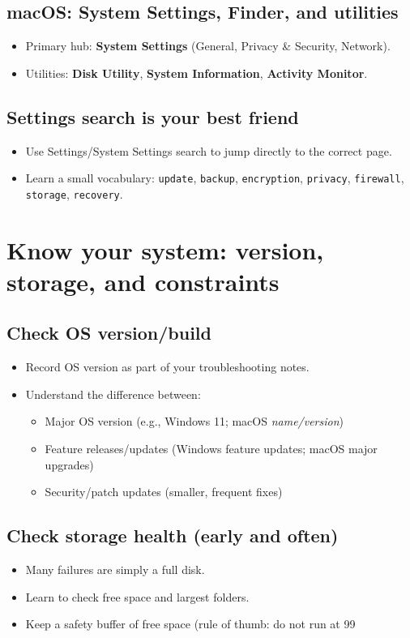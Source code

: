 \subsection{macOS: System Settings, Finder, and utilities}
\begin{itemize}
\item Primary hub: \textbf{System Settings} (General, Privacy \& Security, Network).
\item Utilities: \textbf{Disk Utility}, \textbf{System Information}, \textbf{Activity Monitor}.
\end{itemize}

\subsection{Settings search is your best friend}
\begin{itemize}
\item Use Settings/System Settings search to jump directly to the correct page.
\item Learn a small vocabulary: \texttt{update}, \texttt{backup}, \texttt{encryption}, \texttt{privacy}, \texttt{firewall}, \texttt{storage}, \texttt{recovery}.
\end{itemize}

\section{Know your system: version, storage, and constraints}
\subsection{Check OS version/build}
\begin{itemize}
\item Record OS version as part of your troubleshooting notes.
\item Understand the difference between:
\begin{itemize}
\item Major OS version (e.g., Windows 11; macOS \emph{name/version})
\item Feature releases/updates (Windows feature updates; macOS major upgrades)
\item Security/patch updates (smaller, frequent fixes)
\end{itemize}
\end{itemize}

\subsection{Check storage health (early and often)}
\begin{itemize}
\item Many failures are simply a full disk.
\item Learn to check free space and largest folders.
\item Keep a safety buffer of free space (rule of thumb: do not run at 99%
\end{itemize}

